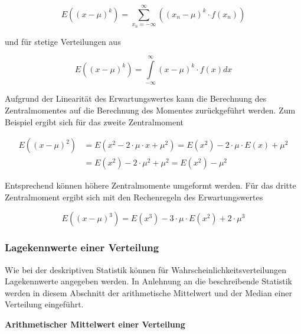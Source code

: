\begin{equation}\label{eq:fourthirtynine}
E\left((x-\mu)^{k} \right)=\sum _{x_{n} =-\infty }^{\infty }\left((x_{n} -\mu)^{k} \cdot f(x_{n} )\right)
\end{equation}

\noindent und f\"{u}r stetige Verteilungen aus

\begin{equation}\label{eq:fourfourty}
E\left((x-\mu)^{k} \right)=\int\limits _{-\infty }^{\infty }\left(x-\mu \right)^{k} \cdot f(x)dx
\end{equation}

\noindent Aufgrund der Linearit\"{a}t des Erwartungswertes kann die Berechnung des Zentralmomentes auf die Berechnung des Momentes zur\"{u}ckgef\"{u}hrt werden. Zum Beispiel ergibt sich f\"{u}r das zweite Zentralmoment 

\begin{equation}\label{eq:fourfourtyone}
\begin{split}
E\left(\left(x-\mu \right)^{2} \right) & = E\left(x^{2} -2\cdot \mu \cdot x+\mu ^{2} \right)=E\left(x^{2} \right)-2\cdot \mu \cdot E\left(x\right)+\mu ^{2}\\
& = E(x^{2}) -2\cdot\mu ^{2} +\mu ^{2} = E(x^{2})-\mu ^{2}
\end{split}
\end{equation}

\noindent Entsprechend k\"{o}nnen h\"{o}here Zentralmomente umgeformt werden. F\"{u}r das dritte Zentralmoment ergibt sich mit den Rechenregeln des Erwartungswertes 

\begin{equation}\label{eq:fourfourtytwo}
E\left((x-\mu )^{3} \right)=E(x^{3} )-3\cdot \mu \cdot E(x^{2})+2\cdot \mu ^{3}
\end{equation}

\subsubsection{Lagekennwerte einer Verteilung}

\noindent Wie bei der deskriptiven Statistik k\"{o}nnen f\"{u}r Wahrscheinlichkeitsverteilungen Lagekennwerte angegeben werden. In Anlehnung an die beschreibende Statistik werden in diesem Abschnitt der arithmetische Mittelwert und der Median einer Verteilung eingef\"{u}hrt.

{\selectfont
\noindent\textbf{Arithmetischer Mittelwert einer Verteilung}}\smallskip

